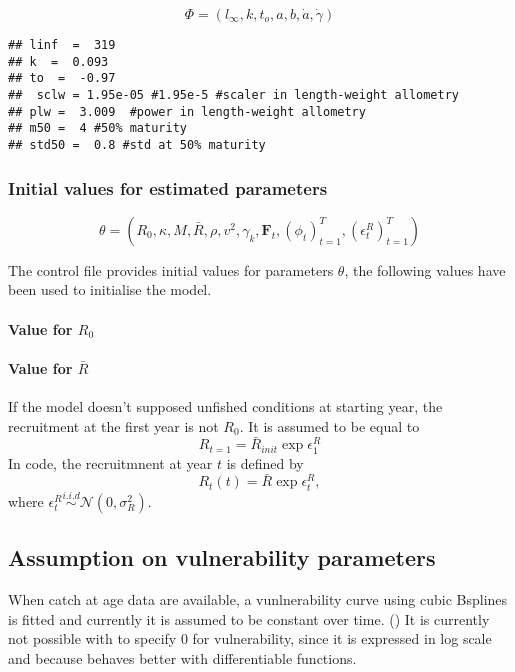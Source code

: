 $$\Phi = (l_\infty, k, t_o,a,b,\dot{a},\dot{\gamma})$$
\begin{verbatim}
## linf  =  319
## k  =  0.093
## to  =  -0.97
##  sclw = 1.95e-05 #1.95e-5 #scaler in length-weight allometry
## plw =  3.009  #power in length-weight allometry
## m50 =  4 #50% maturity
## std50 =  0.8 #std at 50% maturity
\end{verbatim}




\subsubsection{Initial values for estimated parameters}
$$\theta   =  (R_0,   \kappa,   M,  \bar{R},   \rho,  v^2,   \gamma_k,
\boldsymbol{F}_{t}, (\phi_t)_{t=1}^T, (\epsilon_t^R)_{t=1}^T)$$



        
        The  control  file  provides  initial  values  for  parameters
        $\theta$, the  following values  have been used  to initialise
        the model.

\paragraph{Value for $R_0$}


\paragraph{Value for $\bar{R}$}
If the  model doesn't supposed  unfished conditions at  starting year,
the recruitment at  the first year is  not $R_0$. It is  assumed to be
equal to
$$R_{t=1} = \bar{R}_{init} \exp{\epsilon_1^R}$$
In \iscam code, the recruitmnent at year $t$ is defined by
$$R_t(t)=\bar{R} \exp{\epsilon_t^R}, $$
  where $\epsilon_t^R\overset{i.i.d}{\sim} \mathcal{N}(0,\sigma_R^2)$.


\subsection{Assumption on vulnerability parameters}
When catch at age data are available, a vunlnerability curve using cubic Bsplines is fitted and currently it is assumed to be constant over time. ()
It is currently not possible with \iscam to specify 0 for vulnerability, since it is expressed in log scale and because \admb behaves better with differentiable functions.





